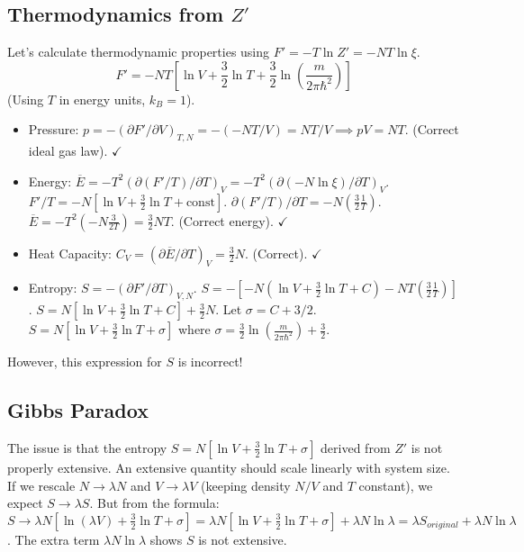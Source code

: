 \documentclass[11pt]{article}
\newcommand{\avg}[1]{\overline{#1}}
\begin{document}
\subsection*{Thermodynamics from $Z'$}
Let's calculate thermodynamic properties using $F' = -T \ln Z' = -NT \ln \xi$.
\[ F' = -NT \left[ \ln V + \frac{3}{2} \ln T + \frac{3}{2} \ln\left(\frac{m}{2\pi\hbar^2}\right) \right] \]
(Using $T$ in energy units, $k_B=1$).
\begin{itemize}
    \item Pressure: $p = -(\partial F' / \partial V)_{T,N} = - (-NT/V) = NT/V \implies pV = NT$. (Correct ideal gas law). $\checkmark$
    \item Energy: $\avg{E} = -T^2 (\partial (F'/T) / \partial T)_V = -T^2 (\partial (-N \ln \xi) / \partial T)_V$.
    $F'/T = -N [\ln V + \frac{3}{2} \ln T + \text{const}]$.
    $\partial(F'/T)/\partial T = -N (\frac{3}{2} \frac{1}{T})$.
    $\avg{E} = -T^2 (-N \frac{3}{2 T}) = \frac{3}{2} NT$. (Correct energy). $\checkmark$
    \item Heat Capacity: $C_V = (\partial \avg{E} / \partial T)_V = \frac{3}{2} N$. (Correct). $\checkmark$
    \item Entropy: $S = -(\partial F' / \partial T)_{V,N}$.
    $S = - [-N(\ln V + \frac{3}{2}\ln T + C) - NT(\frac{3}{2}\frac{1}{T})]$.
    $S = N[\ln V + \frac{3}{2}\ln T + C] + \frac{3}{2}N$. Let $\sigma = C + 3/2$.
    $S = N[\ln V + \frac{3}{2}\ln T + \sigma]$ where $\sigma = \frac{3}{2} \ln(\frac{m}{2\pi\hbar^2}) + \frac{3}{2}$.
\end{itemize}
However, this expression for $S$ is incorrect!

\subsection*{Gibbs Paradox}
The issue is that the entropy $S = N[\ln V + \frac{3}{2}\ln T + \sigma]$ derived from $Z'$ is not properly extensive. An extensive quantity should scale linearly with system size. If we rescale $N \to \lambda N$ and $V \to \lambda V$ (keeping density $N/V$ and $T$ constant), we expect $S \to \lambda S$.
But from the formula:
$S \to \lambda N [\ln(\lambda V) + \frac{3}{2}\ln T + \sigma] = \lambda N [\ln V + \frac{3}{2}\ln T + \sigma] + \lambda N \ln \lambda = \lambda S_{original} + \lambda N \ln \lambda$.
The extra term $\lambda N \ln \lambda$ shows $S$ is not extensive.
\end{document}
